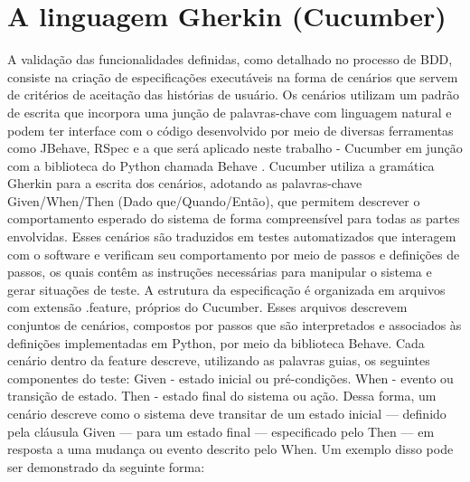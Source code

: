 



\section{A linguagem Gherkin (Cucumber)}
A validação das funcionalidades definidas, como detalhado no processo de BDD, consiste na criação de especificações executáveis na forma de cenários que servem de 
critérios de aceitação das histórias de usuário. Os cenários utilizam um padrão de escrita que incorpora uma junção de palavras-chave com linguagem natural e podem 
ter interface com o código desenvolvido por meio de diversas ferramentas como JBehave, RSpec \cite{cucumberHistory} e a que será aplicado neste trabalho - 
Cucumber \cite{cucumberDocs}  em junção com a biblioteca do Python chamada Behave \cite{behaveDocs}.
Cucumber utiliza a gramática Gherkin para a escrita dos cenários, adotando as palavras-chave Given/When/Then (Dado que/Quando/Então), que permitem descrever o 
comportamento esperado do sistema de forma compreensível para todas as partes envolvidas. Esses cenários são traduzidos em testes automatizados que interagem com 
o software e verificam seu comportamento por meio de passos e definições de passos, os quais contêm as instruções necessárias para manipular o sistema e gerar 
situações de teste.
A estrutura da especificação é organizada em arquivos com extensão .feature, próprios do Cucumber. Esses arquivos descrevem conjuntos de cenários, compostos por 
passos que são interpretados e associados às definições implementadas em Python, por meio da biblioteca Behave. Cada cenário dentro da feature descreve, utilizando 
as palavras guias, os seguintes componentes do teste:
Given - estado inicial ou pré-condições.
When - evento ou transição de estado.
Then - estado final do sistema ou ação.
Dessa forma, um cenário descreve como o sistema deve transitar de um estado inicial — definido pela cláusula Given — para um estado final — especificado pelo Then — em resposta a uma mudança ou evento descrito pelo When. Um exemplo disso pode ser demonstrado da seguinte forma:

